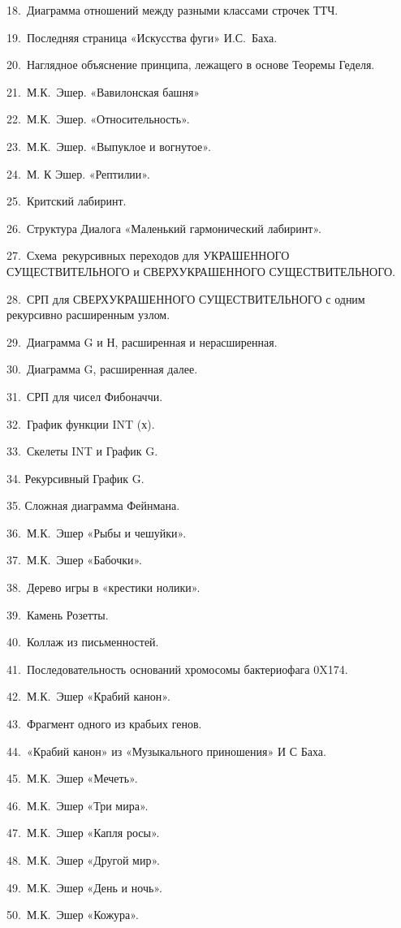 \documentclass[../main.tex]{subfiles}
\begin{document}
18.~Диаграмма отношений между разными классами строчек ТТЧ.

19.~Последняя страница «Искусства фуги» И.С.~Баха.

20.~Наглядное объяснение принципа, лежащего в основе Теоремы Геделя.

21.~М.К.~Эшер. «Вавилонская башня»

22.~М.К.~Эшер. «Относительность».

23.~М.К.~Эшер. «Выпуклое и вогнутое».

24.~М. К Эшер. «Рептилии».

25.~Критский лабиринт.

26.~Структура Диалога «Маленький гармонический лабиринт».

27.~Схема~рекурсивных переходов для УКРАШЕННОГО СУЩЕСТВИТЕЛЬНОГО и СВЕРХУКРАШЕННОГО СУЩЕСТВИТЕЛЬНОГО.

28.~СРП для СВЕРХУКРАШЕННОГО СУЩЕСТВИТЕЛЬНОГО с одним рекурсивно расширенным узлом.

29.~Диаграмма G и Н, расширенная и нерасширенная.

30.~Диаграмма G, расширенная далее.

31.~СРП для чисел Фибоначчи.

32.~График функции INT (х).

33.~Скелеты INT и График G.

34. Рекурсивный График G.

35. Сложная диаграмма Фейнмана.

36.~М.К.~Эшер «Рыбы и чешуйки».

37.~М.К.~Эшер «Бабочки».

38.~Дерево игры в «крестики нолики».

39.~Камень Розетты.

40.~Коллаж из письменностей.

41.~Последовательность оснований хромосомы бактериофага 0X174.

42.~М.К.~Эшер «Крабий канон».

43.~Фрагмент одного из крабьих генов.

44.~«Крабий канон» из «Музыкального приношения» И С Баха.

45.~М.К.~Эшер «Мечеть».

46.~М.К.~Эшер «Три мира».

47.~М.К.~Эшер «Капля росы».

48.~М.К.~Эшер «Другой мир».

49.~М.К.~Эшер «День и ночь».

50.~М.К.~Эшер «Кожура».
\end{document}
